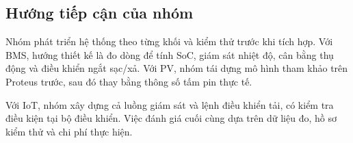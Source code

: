 \subsection{Hướng tiếp cận của nhóm}

Nhóm phát triển hệ thống theo từng khối và kiểm thử trước khi tích hợp. Với BMS, hướng thiết kế là đo dòng để tính SoC, giám sát nhiệt độ, cân bằng thụ động và điều khiển ngắt sạc/xả. Với PV, nhóm tái dựng mô hình tham khảo trên Proteus trước, sau đó thay bằng thông số tấm pin thực tế.

Với IoT, nhóm xây dựng cả luồng giám sát và lệnh điều khiển tải, có kiểm tra điều kiện tại bộ điều khiển. Việc đánh giá cuối cùng dựa trên dữ liệu đo, hồ sơ kiểm thử và chi phí thực hiện.
